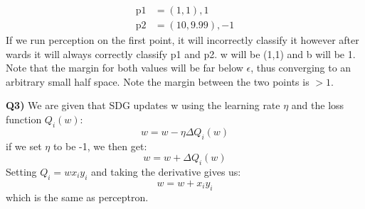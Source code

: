 \documentclass{article}
\begin{document}
\begin{titlepage}
\begin{align*} 
\text{p1} &= (1,1),1 \\
\text{p2} &= (10,9.99),-1
\end{align*}
If we run perception on the first point, it will incorrectly classify it however after wards it will always correctly classify p1 and p2. w will be (1,1) and b will be 1. Note that the margin for both values will be far below $\epsilon$, thus converging to an arbitrary small half space. Note the margin between the two points is $> 1$.
\newpage

\textbf{Q3)} We are given that SDG updates w using the learning rate $\eta$ and the loss function $Q_i(w)$:
\[ w = w - \eta \Delta Q_i(w) \]
if we set $\eta$ to be -1, we then get:
\[ w = w + \Delta Q_i(w) \]
Setting $Q_i = wx_iy_i$ and taking the derivative gives us:
\[ w = w + x_iy_i \]
which is the same as perceptron.
\end{titlepage}
\end{document}
